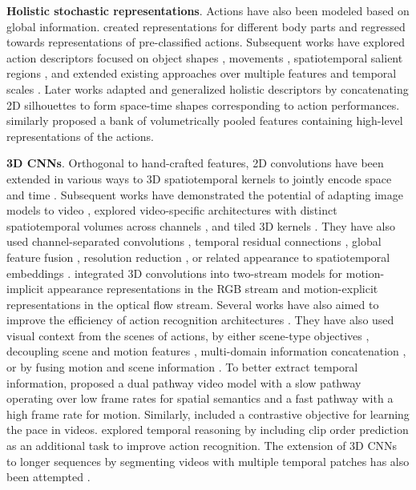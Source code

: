 \noindent
\textbf{Holistic stochastic representations}. Actions have also been modeled based on global information. \citet{efros2003recognizing} created representations for different body parts and regressed towards representations of pre-classified actions. Subsequent works have explored action descriptors focused on object shapes \citep{gorelick2006shape,jia2008human}, movements \citep{sun2009action}, spatiotemporal salient regions \citep{wong2007extracting}, and extended existing approaches over multiple features and temporal scales \citep{amer2012sum,liu2008recognizing,zelnik2001event,yang2020temporal}. Later works \citep{blank2005actions} adapted and generalized holistic descriptors \citep{gorelick2006shape} by concatenating 2D silhouettes to form space-time shapes corresponding to action performances. \citet{sadanand2012action} similarly proposed a bank of volumetrically pooled features containing high-level representations of the actions. 


\noindent
\textbf{3D CNNs}. Orthogonal to hand-crafted features, 2D convolutions have been extended in various ways to 3D spatiotemporal kernels to jointly encode space and time \citep{baccouche2011sequential,ji20123d,taylor2010convolutional,tran2015learning}. Subsequent works have demonstrated the potential of adapting image models to video \citep{hara2018can}, explored video-specific architectures with distinct spatiotemporal volumes across channels \citep{chen2018multi}, and tiled 3D kernels \citep{hegde2018morph}. They have also used channel-separated convolutions \citep{jiang2019stm,luo2019grouped,tran2019video}, temporal residual connections \citep{qiu2017learning}, global feature fusion \citep{qiu2019learning}, resolution reduction \citep{chen2019drop,stergiou2021multi}, or related appearance to spatiotemporal embeddings \citep{wang2018appearance,zhou2018mict}. \citet{carreira2017quo} integrated 3D convolutions into two-stream models for motion-implicit appearance representations in the RGB stream and motion-explicit representations in the optical flow stream. Several works have also aimed to improve the efficiency of action recognition architectures \citep{feichtenhofer2020x3d,kondratyuk2021movinets,liu2022convnet}. They have also used visual context from the scenes of actions, by either scene-type objectives \citep{choi2019can}, decoupling scene and motion features \citep{wang2021enhancing}, multi-domain information concatenation \citep{plizzari2023can,kapidis2021multi}, or by fusing motion and scene information \citep{stergiou2021learn}. To better extract temporal information, \citet{feichtenhofer2019slowfast} proposed a dual pathway video model with a slow pathway operating over low frame rates for spatial semantics and a fast pathway with a high frame rate for motion. Similarly, \citet{wang2020self} included a contrastive objective for learning the pace in videos. \citet{xu2019self} explored temporal reasoning by including clip order prediction as an additional task to improve action recognition. The extension of 3D CNNs to longer sequences by segmenting videos with multiple temporal patches has also been attempted \citep{ji2020action,hussein2019timeception,varol2017long}.


